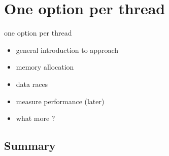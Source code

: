 \chapter{One option per thread}
\label{chapter:oneoptionperthread}
one option per thread
\begin{itemize}
\item general introduction to approach
\item memory allocation
\item data races
\item measure performance (later)
\item what more ?
\end{itemize}

\section*{Summary}
